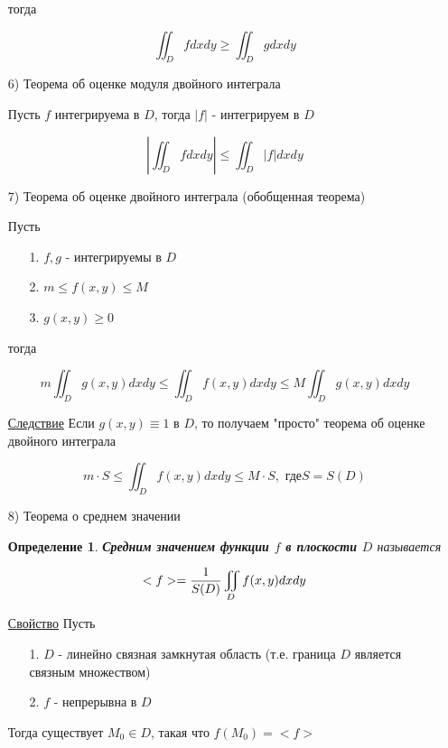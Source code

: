 \documentclass[a4paper, 14pt]{report}
\newtheorem{defenition}{Определение}[chapter]
\begin{document}
\begin{enumerate}
    тогда
    
    $$ \iint_D f dxdy \geq \iint_D g dxdy $$
    
    \item[6)] Теорема об оценке модуля двойного интеграла
    
    Пусть $f$ интегрируема в $D$, тогда $|f|$ - интегрируем в $D$
    
    $$ |\iint_D f dxdy| \le \iint_D |f| dxdy $$
    
    \item[7)] Теорема об оценке двойного интеграла (обобщенная теорема)
    
    Пусть 
    
    \begin{enumerate}
        \item[1.] $f,g$ - интегрируемы в $D$
        \item[2.] $m \le f(x,y) \le M$
        \item[3.] $g(x,y) \geq 0$
    \end{enumerate}
    
    тогда
    
    $$ m \iint_D g(x,y) dxdy \le \iint_D f(x,y) dxdy \le M \iint_D g(x,y) dxdy $$
    
    \underline{Следствие} Если $g(x,y) \equiv 1$ в $D$, то получаем "просто" теорема об оценке двойного интеграла
    
    $$ m \cdot S \le \iint_D f(x,y) dxdy \le M \cdot S, \text{ где} S = S(D)$$
    
    
    \item[8)] Теорема о среднем значении
    
        \begin{defenition}
            \textbf{Средним значением функции $f$ в плоскости $D$} называется
        \end{defenition}
    
    $$ <f> = {1 \over S(D)} \iint_D f(x,y) dxdy $$
    
    \underline{Свойство} Пусть 
    
    \begin{enumerate}
        \item[1.] $D$ - линейно связная замкнутая область (т.е. граница $D$ является связным множеством)
        \item[2.] $f$ - непрерывна в $D$
    \end{enumerate}
    
    Тогда существует $M_0 \in D$, такая что $f(M_0) = <f>$
    

\end{enumerate}
\end{document}
